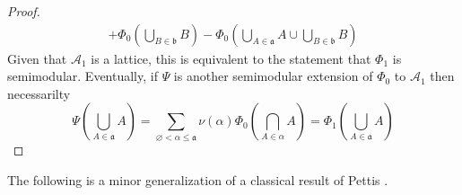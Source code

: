 \documentclass[11pt]{amsart}
\theoremstyle{plain}
\begin{document}
\begin{proof}
\begin{align*}
+\Phi_0\left(\bigcup_{B\in{\mathfrak b}}B\right)
-\Phi_0\left(\bigcup_{A\in{\mathfrak a}}A\cup\bigcup_{B\in{\mathfrak b}}B\right)
\end{align*}
Given that ${\mathscr{A}}_1$ is a lattice, this is equivalent to the statement that $\Phi_1$ is 
semimodular. Eventually, if $\Psi$ is another semimodular extension of $\Phi_0$ to 
${\mathscr{A}}_1$ then necessarilty
\begin{equation*}
\Psi\left(\bigcup_{A\in{\mathfrak a}}A\right)
=
\sum_{{\varnothing}<\alpha\le{\mathfrak a}}\nu(\alpha)\Phi_0\left(\bigcap_{A\in\alpha}A\right)
=
\Phi_1\left(\bigcup_{A\in{\mathfrak a}}A\right)
\end{equation*}
\end{proof}

The following is a minor generalization of a classical result of Pettis 
\cite[Theorem 1.2, p. 188]{pettis}.
\end{document}
